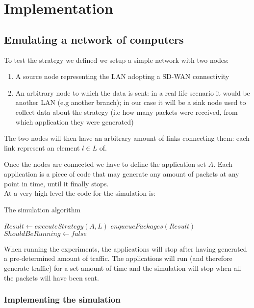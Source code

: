 
\chapter{Implementation}

\section{Emulating a network of computers}


To test the strategy we defined we setup a simple network with two nodes:
\begin{enumerate}
	\item A source node representing the LAN adopting a SD-WAN connectivity
	\item An arbitrary node to which the data is sent: in a real life scenario it would be another LAN (e.g another branch); in our case it will be a sink node used to collect data about the strategy (i.e how many packets were received, from which application they were generated)  
\end{enumerate}

The two nodes will then have an arbitrary amount of links connecting them: each link represent an element $l \in L$ of.

Once the nodes are connected we have to define the application set $A$.
Each application is a piece of code that may generate any amount of packets at any point in time, until it finally stops.\\

At a very high level the code for the simulation is:

\begin{algorithm}
	\caption{The simulation algorithm}\label{alg:simulation}
	\begin{algorithmic}
		\State $Result \gets executeStrategy(A, L)$
		\State $enqueuePackages(Result)$
		\State $ShouldBeRunning \gets false$
		\EndIf
		\EndWhile
	\end{algorithmic}
\end{algorithm}

When running the experiments, the applications will stop after having generated a pre-determined amount of traffic. The applications will run (and therefore generate traffic) for a set amount of time and the simulation will stop when all the packets will have been sent.

\subsection{Implementing the simulation}

